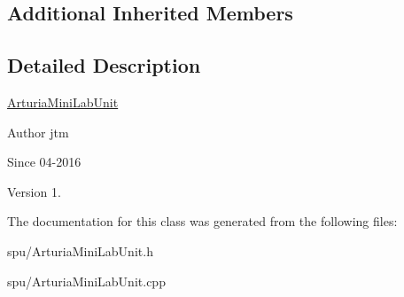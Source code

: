 \subsection*{Additional Inherited Members}


\subsection{Detailed Description}
\hyperlink{classArturiaMiniLabUnit}{Arturia\+Mini\+Lab\+Unit}

\begin{DoxyAuthor}{Author}
jtm 
\end{DoxyAuthor}
\begin{DoxySince}{Since}
04-\/2016 
\end{DoxySince}
\begin{DoxyVersion}{Version}
1. 
\end{DoxyVersion}


The documentation for this class was generated from the following files\+:\begin{DoxyCompactItemize}
\item 
spu/Arturia\+Mini\+Lab\+Unit.\+h\item 
spu/Arturia\+Mini\+Lab\+Unit.\+cpp\end{DoxyCompactItemize}
